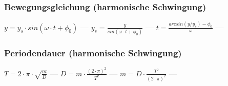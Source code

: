 \subsubsection{Bewegungsgleichung (harmonische Schwingung)} 
\begin{minipage}{0.45\textwidth} 
\end{minipage} 
\begin{minipage}{0.45\textwidth} 
 
\end{minipage} 
$ y = y_{s} \cdot sin(\omega \cdot t+\phi _{0} ) $ \textcolor{lightgray}{\textbf{---}} 
$ y_{s} = \frac{    y}{sin(\omega \cdot t+\phi _{0} )} $ \textcolor{lightgray}{\textbf{---}} 
$ t = \frac{arcsin(y/y_{s} )-\phi _{0} }{    \omega } $ \textcolor{lightgray}{\textbf{---}} 

\subsubsection{Periodendauer (harmonische Schwingung)} 
\begin{minipage}{0.45\textwidth} 
\end{minipage} 
\begin{minipage}{0.45\textwidth} 
 
\end{minipage} 
$ T = 2\cdot \pi \cdot \sqrt{\frac{m}{D}} $ \textcolor{lightgray}{\textbf{---}} 
$ D= m\cdot \frac{(2\cdot \pi )^{2} }{  T^{2} } $ \textcolor{lightgray}{\textbf{---}} 
$ m= D\cdot \frac{ T^{2} }{(2\cdot \pi )^{2} } $ \textcolor{lightgray}{\textbf{---}} 

